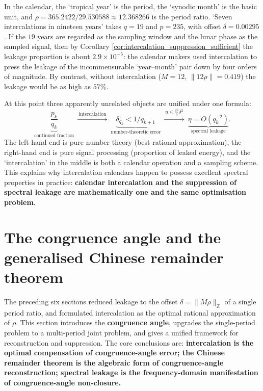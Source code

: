 \begin{example}\label{ex:calendar_intercalation_parallel}
In the calendar, the `tropical year' is the period, the `synodic month' is the basic unit, and $\rho=365.2422/29.530588\approx12.368266$ is the period ratio. `Seven intercalations in nineteen years' takes $q=19$ and $p=235$, with offset $\delta=0.00295$. If the $19$ years are regarded as the sampling window and the lunar phase as the sampled signal, then by Corollary \ref{cor:intercalation_suppression_sufficient} the leakage proportion is about $2.9\times10^{-5}$: the calendar makers used intercalation to press the leakage of the incommensurable `year--month' pair down by four orders of magnitude. By contrast, without intercalation ($M=12$, $\|12\rho\|=0.419$) the leakage would be as high as $57\%$.
\end{example}

\begin{remark}\label{rem:leakage_intercalation_unified}
At this point three apparently unrelated objects are unified under one formula:
\[
\underbrace{\frac{p_k}{q_k}}_{\text{continued fraction}}\ \xrightarrow{\ \text{intercalation}\ }\ \underbrace{\delta_{q_k}<1/q_{k+1}}_{\text{number-theoretic error}}\ \xrightarrow{\ \eta\le\frac{\pi^2}{3}\delta^2\ }\ \underbrace{\eta=O(q_k^{-2})}_{\text{spectral leakage}} .
\]
The left-hand end is pure number theory (best rational approximation), the right-hand end is pure signal processing (proportion of leaked energy), and the `intercalation' in the middle is both a calendar operation and a sampling scheme. This explains why intercalation calendars happen to possess excellent spectral properties in practice: \textbf{calendar intercalation and the suppression of spectral leakage are mathematically one and the same optimisation problem}.
\end{remark}

\section{The congruence angle and the generalised Chinese remainder theorem}\label{sec:congruence_angle_crt}

The preceding six sections reduced leakage to the offset $\delta=\|M\rho\|_{\mathbb{Z}}$ of a single period ratio, and formulated intercalation as the optimal rational approximation of $\rho$. This section introduces the \textbf{congruence angle}, upgrades the single-period problem to a multi-period joint problem, and gives a unified framework for reconstruction and suppression. The core conclusions are: \textbf{intercalation is the optimal compensation of congruence-angle error; the Chinese remainder theorem is the algebraic form of congruence-angle reconstruction; spectral leakage is the frequency-domain manifestation of congruence-angle non-closure.}

